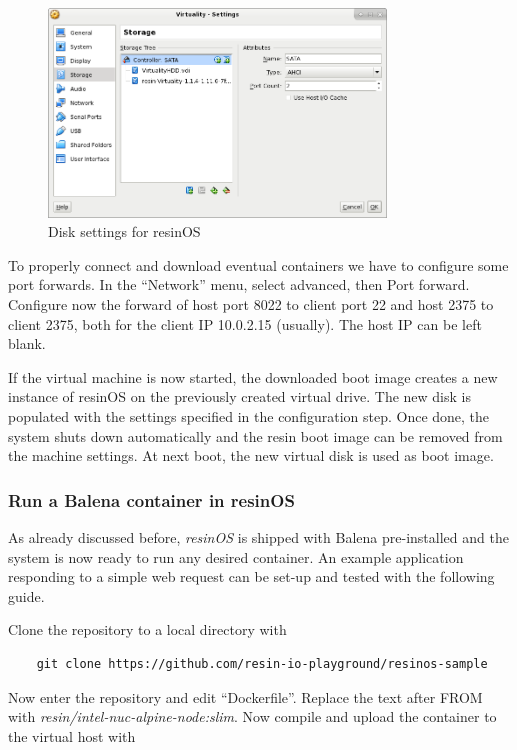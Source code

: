 \documentclass[]{scrartcl}
\begin{document}
\begin{figure}[t]
	\centering
	\includegraphics[width=0.8\textwidth]{resin-vbox2}
	\caption{Disk settings for resinOS}
	\label{fig:resindisk}
\end{figure}

To properly connect and download eventual containers we have to configure some port forwards. In the ``Network'' menu, select advanced, then Port forward. Configure now the forward of host port 8022 to client port 22 and host 2375 to client 2375, both for the client IP 10.0.2.15 (usually). The host IP can be left blank.

If the virtual machine is now started, the downloaded boot image creates a new instance of resinOS on the previously created virtual drive. The new disk is populated with the settings specified in the configuration step. Once done, the system shuts down automatically and the resin boot image can be removed from the machine settings. At next boot, the new virtual disk is used as boot image.

\subsubsection{Run a Balena container in resinOS}

As already discussed before, \textit{resinOS} is shipped with Balena pre-installed and the system is now ready to run any desired container. 
An example application responding to a simple web request can be set-up and tested with the following guide.

Clone the repository to a local directory with
\begin{verbatim}
	git clone https://github.com/resin-io-playground/resinos-sample
\end{verbatim}

Now enter the repository and edit ``Dockerfile''. Replace the text after FROM with \textit{resin/intel-nuc-alpine-node:slim}. Now compile and upload the container to the virtual host with
\end{document}
